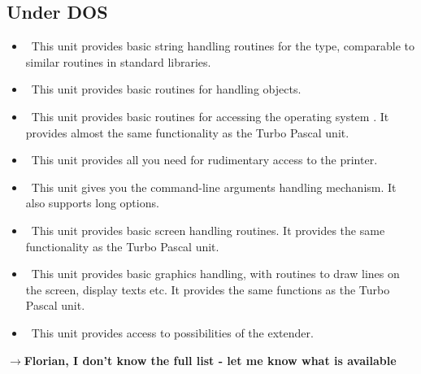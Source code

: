 \documentclass{report}
\newcommand{\remark}[1]{\par$\rightarrow$\textbf{#1}\par}
\begin{document}
\subsection{Under DOS}
\begin{itemize}
\item \seestrings\ This unit provides basic
string handling routines for the  type, comparable to similar
routines in standard  libraries.
\item \seeobjects\  This unit provides basic
routines for handling objects.
\item \seedos\ This unit provides basic routines for
accessing the operating system \dos. It provides almost the same
functionality as the Turbo Pascal unit. 
\item \seeprinter\  This unit provides all you
need for rudimentary access to the printer.
\item \seegetopts\ This unit gives you the
\gnu {} command-line arguments  handling mechanism. 
It also supports long options.
\item \seecrt\ This unit provides basic screen
handling routines. It provides the same functionality  as the Turbo Pascal 
unit.
\item \seegraph\ This unit provides basic graphics
handling, with routines to draw lines on the screen, display texts etc. It
provides the same functions as the Turbo Pascal unit.
\item \seego\ This unit provides access to possibilities of the 
\dos extender.
\end{itemize}
\remark{Florian, I don't know the full list - let me know what is available}

%
%

\end{document}
